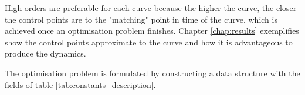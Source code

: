\par High orders are preferable for each curve \cite{cichella2018bernstein} because the higher the curve, the closer the control points are to the "matching" point in time of the curve, which is achieved once an optimisation problem finishes. Chapter \ref{chap:results} exemplifies show the control points approximate to the curve and how it is advantageous to produce the dynamics.

%
%
%


\par The optimisation problem is formulated by constructing a data structure with the fields of table \ref{tab:constants_description}. %


